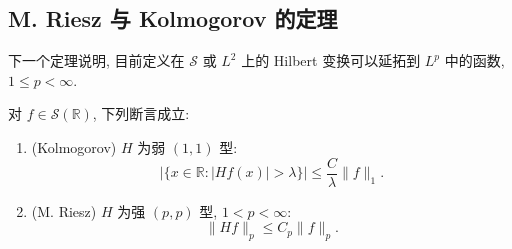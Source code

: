 \subsection{M. Riesz 与 Kolmogorov 的定理}
\label{sec:ch3-riesz-kolmogorov-theorems}

下一个定理说明, 目前定义在 $\mathcal S$ 或 $L^2$ 上的 Hilbert 变换可以延拓到 $L^p$ 中的函数, $1\le p<\infty$.

\begin{Theorem}
\label{thm:ch3-riesz-kolmogorov}
对 $f\in\mathcal S(\mathbb R)$, 下列断言成立:

\begin{enumerate}
\item (Kolmogorov) $H$ 为弱 $(1,1)$ 型:
\[
 \bigl|\{x\in\mathbb R:|Hf(x)|>\lambda\}\bigr|
 \le \frac C\lambda\|f\|_1.
\]

\item (M. Riesz) $H$ 为强 $(p,p)$ 型, $1<p<\infty$:
\[
 \|Hf\|_p\le C_p\|f\|_p.
\]
\end{enumerate}
\end{Theorem}

